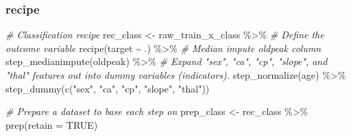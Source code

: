 \documentclass[
]{book}
\newenvironment{Shaded}{\begin{snugshade}}{\end{snugshade}}
\newcommand{\AttributeTok}[1]{\textcolor[rgb]{0.77,0.63,0.00}{#1}}
\newcommand{\CommentTok}[1]{\textcolor[rgb]{0.56,0.35,0.01}{\textit{#1}}}
\newcommand{\ConstantTok}[1]{\textcolor[rgb]{0.00,0.00,0.00}{#1}}
\newcommand{\FunctionTok}[1]{\textcolor[rgb]{0.00,0.00,0.00}{#1}}
\newcommand{\NormalTok}[1]{#1}
\newcommand{\OtherTok}[1]{\textcolor[rgb]{0.56,0.35,0.01}{#1}}
\newcommand{\SpecialCharTok}[1]{\textcolor[rgb]{0.00,0.00,0.00}{#1}}
\newcommand{\StringTok}[1]{\textcolor[rgb]{0.31,0.60,0.02}{#1}}
\begin{document}
\hypertarget{recipe-1}{%
\subsubsection{recipe}\label{recipe-1}}

\begin{Shaded}
\begin{Highlighting}[]
\CommentTok{\# Classification recipe }
\NormalTok{rec\_class }\OtherTok{\textless{}{-}}\NormalTok{ raw\_train\_x\_class }\SpecialCharTok{\%\textgreater{}\%} 
  \CommentTok{\# Define the outcome variable }
  \FunctionTok{recipe}\NormalTok{(target }\SpecialCharTok{\textasciitilde{}}\NormalTok{ .) }\SpecialCharTok{\%\textgreater{}\%}
  \CommentTok{\# Median impute oldpeak column }
  \FunctionTok{step\_medianimpute}\NormalTok{(oldpeak) }\SpecialCharTok{\%\textgreater{}\%}
  \CommentTok{\# Expand "sex", "ca", "cp", "slope", and "thal" features out into dummy variables (indicators).}
  \FunctionTok{step\_normalize}\NormalTok{(age) }\SpecialCharTok{\%\textgreater{}\%}
  \FunctionTok{step\_dummy}\NormalTok{(}\FunctionTok{c}\NormalTok{(}\StringTok{"sex"}\NormalTok{, }\StringTok{"ca"}\NormalTok{, }\StringTok{"cp"}\NormalTok{, }\StringTok{"slope"}\NormalTok{, }\StringTok{"thal"}\NormalTok{)) }

\CommentTok{\# Prepare a dataset to base each step on}
\NormalTok{prep\_class }\OtherTok{\textless{}{-}}\NormalTok{ rec\_class }\SpecialCharTok{\%\textgreater{}\%} \FunctionTok{prep}\NormalTok{(}\AttributeTok{retain =} \ConstantTok{TRUE}\NormalTok{) }
\end{Highlighting}
\end{Shaded}

\begin{Shaded}
\end{Shaded}
\end{document}
